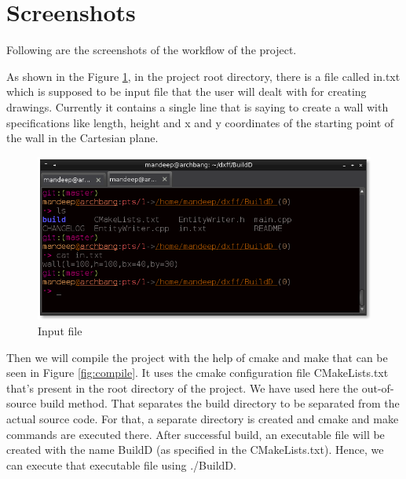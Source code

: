 \section{Screenshots}

Following are the screenshots of the workflow of the project.

As shown in the Figure \ref{fig:input}, in the project root directory, there is a file called in.txt which is supposed to be input file that the user will dealt with for creating drawings. Currently it contains a single line that is saying to create a wall with specifications like length, height and x and y coordinates of the starting point of the wall in the Cartesian plane.

\begin{figure}
\centering
\includegraphics[scale=0.5]{images/bld0.png}
\caption{Input file}
\label{fig:input}
\end{figure}

Then we will compile the project with the help of cmake and make that can be seen in Figure \ref{fig:compile}. It uses the cmake configuration file CMakeLists.txt that's present in the root directory of the project. We have used here the out-of-source build method. That separates the build directory to be separated from the actual source code. For that, a separate directory is created and cmake and make commands are executed there.
After successful build, an executable file will be created with the name BuildD (as specified in the CMakeLists.txt). Hence, we can execute that executable file using ./BuildD.

